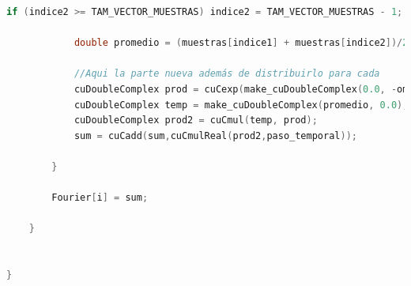 \documentclass[12pt]{article}
\begin{document}
\begin{lstlisting}[language=C++, basicstyle=\ttfamily\small, frame=single]
            if (indice2 >= TAM_VECTOR_MUESTRAS) indice2 = TAM_VECTOR_MUESTRAS - 1;

            double promedio = (muestras[indice1] + muestras[indice2])/2.0;

            //Aqui la parte nueva además de distribuirlo para cada
            cuDoubleComplex prod = cuCexp(make_cuDoubleComplex(0.0, -omega * j));
            cuDoubleComplex temp = make_cuDoubleComplex(promedio, 0.0);
            cuDoubleComplex prod2 = cuCmul(temp, prod);
            sum = cuCadd(sum,cuCmulReal(prod2,paso_temporal));

        }

        Fourier[i] = sum;

    }


}


\end{lstlisting}
\end{document}
